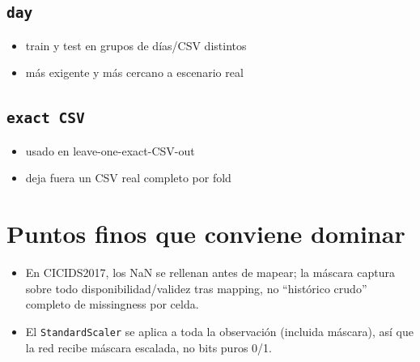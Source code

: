 ﻿\documentclass[12pt,a4paper]{article}
\begin{document}
\subsection{\texttt{day}}

\begin{itemize}
  \item train y test en grupos de días/CSV distintos
  \item más exigente y más cercano a escenario real
\end{itemize}

\subsection{\texttt{exact CSV}}

\begin{itemize}
  \item usado en leave-one-exact-CSV-out
  \item deja fuera un CSV real completo por fold
\end{itemize}

\section{Puntos finos que conviene dominar}

\begin{itemize}
  \item En CICIDS2017, los NaN se rellenan antes de mapear; la máscara captura sobre todo
        disponibilidad/validez tras mapping, no ``histórico crudo'' completo de missingness por
        celda.
  \item El \texttt{StandardScaler} se aplica a toda la observación (incluida máscara), así que la
        red recibe máscara escalada, no bits puros 0/1.
\end{itemize}
\end{document}
